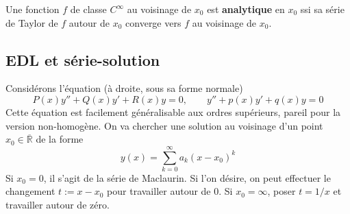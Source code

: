 	Une fonction $f$ de classe $C^\infty$ au voisinage de $x_0$ est \textbf{analytique} 
	en $x_0$ ssi sa série de Taylor de $f$ autour de $x_0$ converge vers $f$ au 
	voisinage de $x_0$.\\
	
	
	
	
	\subsection{EDL et série-solution}	
	Considérons l'équation (à droite, sous sa forme normale)
	\begin{equation}
	P(x)y'' + Q(x)y' + R(x)y = 0,\qquad y''+p(x)y'+q(x)y=0
	\end{equation}
	Cette équation est facilement généralisable aux ordres supérieurs, pareil pour la
	version non-homogène. On va chercher une solution au voisinage d'un point $x_0\in
	\overline{\mathbb{R}}$ 	de la forme
	\begin{equation}
	y(x) = \sum_{k=0}^\infty a_k(x-x_0)^k
	\end{equation}
	Si $x_0=0$, il s'agit de la série de Maclaurin. Si l'on désire, on peut effectuer 
	le changement $t :=x-x_0$ pour travailler autour de 0. Si $x_0=\infty$, poser 
	$t=1/x$ et travailler autour de zéro.
	
